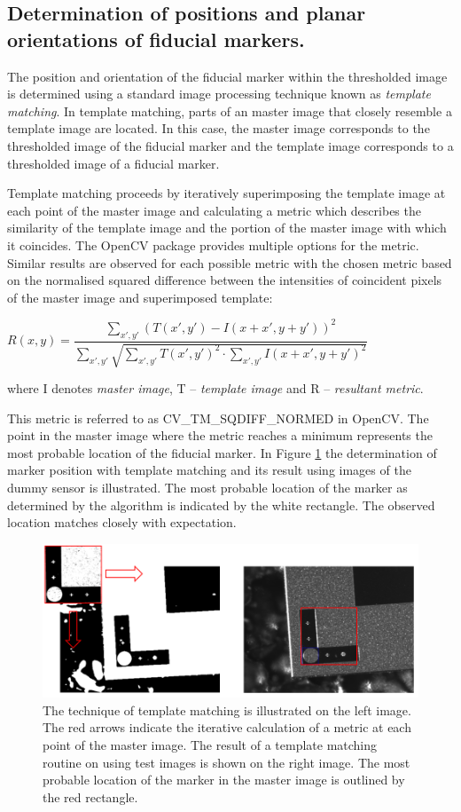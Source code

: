 \subsection{Determination of positions and planar orientations of fiducial markers.}
The position and orientation of the fiducial marker within the thresholded image is determined using a standard image processing technique known as \emph{template matching}. In template matching, parts of an master image that closely resemble a template image are located. In this case, the master image corresponds to the thresholded image of the fiducial marker and the template image corresponds to a thresholded image of a fiducial marker.

Template matching proceeds by iteratively superimposing the template image at each point of the master image and calculating a metric which describes the similarity of the template image and the portion of the master image with which it coincides. The OpenCV package provides multiple options for the metric. Similar results are observed for each possible metric with the chosen metric based on the normalised squared difference between the intensities of coincident pixels of the master image and superimposed template:


\begin{center}
$R(x,y)=\dfrac{\sum_{x',y'}^{}(T(x',y')-I(x+x',y+y'))^{2}}{\sum_{x',y'}^{}\sqrt{\sum_{x',y'}^{}T(x',y')^{2}\cdot\sum_{x',y'}^{}I(x+x',y+y')^{2}}}$
\end{center}
where I denotes \emph{master image}, T -- \emph{template image} and R -- \emph{resultant metric}.

This metric is referred to as CV\_TM\_SQDIFF\_NORMED in OpenCV. The point in the master image where the metric reaches a minimum represents the most probable location of the fiducial marker. In Figure \ref{fig:template_matching} the determination of marker position with template matching and its result using images of the dummy sensor is illustrated. The most probable location of the marker as determined by the algorithm is indicated by the white rectangle. The observed location matches closely with expectation.

\begin{figure}[ht]\centering
\includegraphics[width=0.9\linewidth]{Data/Control_Software/Template_matching.png}
\caption{The technique of template matching is illustrated on the left image. The red arrows indicate the iterative calculation of a metric at each point of the master image. The result of a template matching routine on using test images is shown on the right image. The most probable location of the marker in the master image is outlined by the red rectangle.}
\label{fig:template_matching}
\end{figure}

